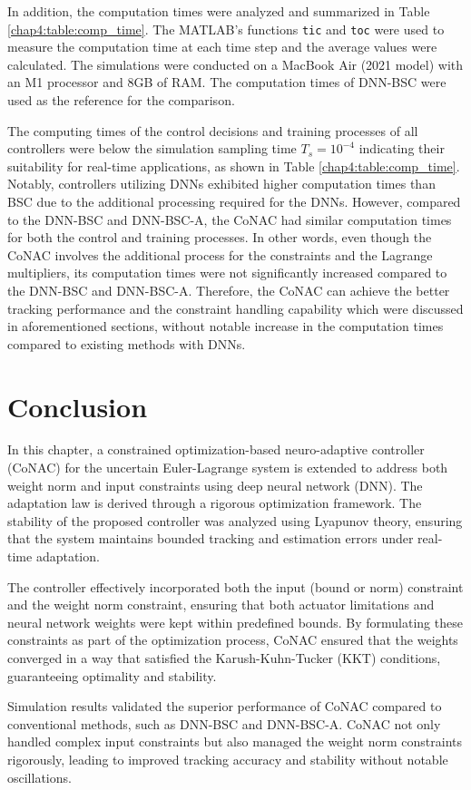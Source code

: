 In addition, the computation times were analyzed and summarized in Table \ref{chap4:table:comp_time}.
The MATLAB's functions \texttt{tic} and \texttt{toc} were used to measure the computation time at each time step and the average values were calculated.
The simulations were conducted on a MacBook Air (2021 model) with an M1 processor and 8GB of RAM.
The computation times of DNN-BSC were used as the reference for the comparison.

The computing times of the control decisions and training processes of all controllers were below the simulation sampling time $T_s=10^{-4}$ indicating their suitability for real-time applications, as shown in Table \ref{chap4:table:comp_time}.
Notably, controllers utilizing DNNs exhibited higher computation times than BSC due to the additional processing required for the DNNs.
However, compared to the DNN-BSC and DNN-BSC-A, the CoNAC had similar computation times for both the control and training processes.
In other words, even though the CoNAC involves the additional process for the constraints and the Lagrange multipliers, its computation times were not significantly increased compared to the DNN-BSC and DNN-BSC-A.
Therefore, the CoNAC can achieve the better tracking performance and the constraint handling capability which were discussed in aforementioned sections, without notable increase in the computation times compared to existing methods with DNNs.  

\section{Conclusion} 

In this chapter, a constrained optimization-based neuro-adaptive controller (CoN\allowbreak AC) for the uncertain Euler-Lagrange system is extended to address both weight norm and input constraints using deep neural network (DNN).
The adaptation law is derived through a rigorous optimization framework. 
The stability of the proposed controller was analyzed using Lyapunov theory, ensuring that the system maintains bounded tracking and estimation errors under real-time adaptation.

The controller effectively incorporated both the input (bound or norm) constraint and the weight norm constraint, ensuring that both actuator limitations and neural network weights were kept within predefined bounds. 
By formulating these constraints as part of the optimization process, CoNAC ensured that the weights converged in a way that satisfied the Karush-Kuhn-Tucker (KKT) conditions, guaranteeing optimality and stability.

Simulation results validated the superior performance of CoNAC compared to conventional methods, such as DNN-BSC and DNN-BSC-A. 
CoNAC not only handled complex input constraints but also managed the weight norm constraints rigorously, leading to improved tracking accuracy and stability without notable oscillations.
